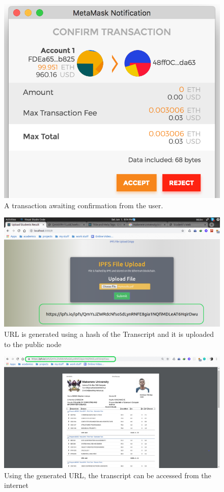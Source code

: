 \begin{figure}[H]
\center
\includegraphics[scale=0.4]{images/MetamaskNotification.png}
\caption{A transaction awaiting confirmation from the user.}
\end{figure}

\begin{figure}[H]
\includegraphics[scale=0.4]{images/UploadToIPFS.png}
\caption{URL is generated using a hash of the Transcript and it is uploaded to the public node}
\end{figure}

\begin{figure}[H]
\includegraphics[scale=0.4]{images/RevealIPFS.png}
\caption{Using the generated URL, the transcript can be accessed from the internet}
\end{figure}